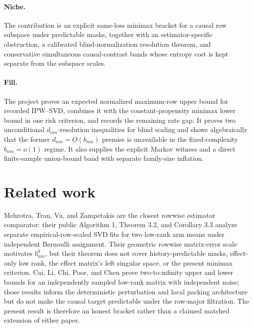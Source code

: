 \documentclass{article}
\begin{document}
\paragraph{Niche.} The contribution is an explicit same-loss minimax bracket for a causal row subspace under predictable masks, together with an estimator-specific obstruction, a calibrated blind-normalization resolution theorem, and conservative simultaneous causal-contrast bands whose entropy cost is kept separate from the subspace scales.

\paragraph{Fill.} The project proves an expected normalized maximum-row upper bound for recorded IPW--SVD, combines it with the constant-propensity minimax lower bound in one risk criterion, and records the remaining rate gap.  It proves two unconditional \(d_{nm}\)-resolution inequalities for blind scaling and shows algebraically that the former \(d_{nm}=O(b_{nm})\) premise is unavailable in the fixed-complexity \(b_{nm}=o(1)\) regime.  It also supplies the explicit Markov witness and a direct finite-sample union-bound band with separate family-size inflation.

\section{Related work}

Mehrotra, Tran, Vu, and Zampetakis are the closest rowwise estimator comparator: their public Algorithm 1, Theorem 3.2, and Corollary 3.3 analyze separate empirical-row-scaled SVD fits for two low-rank arm means under independent Bernoulli assignment.  Their geometric rowwise matrix-error scale motivates \(b^0_{nm}\), but their theorem does not cover history-predictable masks, effect-only low rank, the effect matrix's left singular space, or the present minimax criterion.  Cai, Li, Chi, Poor, and Chen prove two-to-infinity upper and lower bounds for an independently sampled low-rank matrix with independent noise; those results inform the deterministic perturbation and local packing architecture but do not make the causal target predictable under the row-major filtration.  The present result is therefore an honest bracket rather than a claimed matched extension of either paper.
\end{document}
